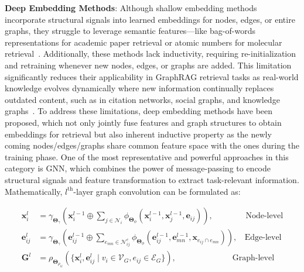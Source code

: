 \textbf{Deep Embedding Methods}:
Although shallow embedding methods incorporate structural signals into learned embeddings for nodes, edges, or entire graphs, they struggle to leverage semantic features—like bag-of-words representations for academic paper retrieval or atomic numbers for molecular retrieval~\cite{fey2019fast}. Additionally, these methods lack inductivity, requiring re-initialization and retraining whenever new nodes, edges, or graphs are added. This limitation significantly reduces their applicability in GraphRAG retrieval tasks as real-world knowledge evolves dynamically where new information continually replaces outdated content, such as in citation networks, social graphs, and knowledge graphs~\cite{cheng2024multi, wang2023knowledge, wu2024updating}. To address these limitations, deep embedding methods have been proposed, which not only jointly fuse features and graph structures to obtain embeddings for retrieval but also inherent inductive property as the newly coming nodes/edges/graphs share common feature space with the ones during the training phase. One of the most representative and powerful approaches in this category is GNN, which combines the power of message-passing to encode structural signals and feature transformation to extract task-relevant information. Mathematically, $l^{\text{th}}$-layer graph convolution can be formulated as:

\begin{align}
    \mathbf{x}_i^l &= \gamma_{\boldsymbol{\Theta}_{\gamma}} \left( \mathbf{x}_i^{l-1} \oplus \sum_{j \in \mathcal{N}_{i}} \phi_{\boldsymbol{\Theta}_{\phi}} \left( \mathbf{x}_i^{l-1}, \mathbf{x}_j^{l-1}, \mathbf{e}_{ij} \right) \right),~~~~~~~~~~~~~~~~~~\text{Node-level} \label{eq-node_level}\\
    \mathbf{e}_{ij}^l &= \gamma_{\boldsymbol{\Theta}_{\gamma}} \left( \mathbf{e}_{ij}^{l-1} \oplus \sum_{e_{mn} \in \mathcal{N}_{ij}^{e}} \phi_{\boldsymbol{\Theta}_{\phi}} \left( \mathbf{e}_{ij}^{l-1}, \mathbf{e}_{mn}^{l-1}, \mathbf{x}_{e_{ij}\cap e_{mn}} \right) \right),~~~~\text{Edge-level} \label{eq-edge_level}\\
    \mathbf{G}^l &= \rho_{\boldsymbol{\Theta}_{\rho_G}}(\{\mathbf{x}_i^l, \mathbf{e}_{ij}^l \mid v_i \in \mathcal{V}_G, e_{ij} \in \mathcal{E}_{G}\}),~~~~~~~~~~~~~~~~~~~~~~~~~~~~~~~\text{Graph-level} \label{eq-graph_level}
\end{align}



